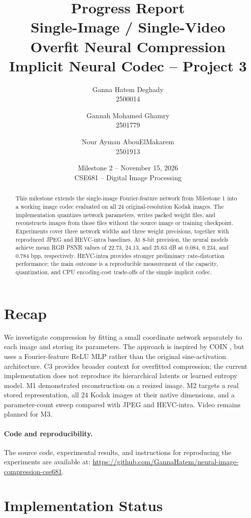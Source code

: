 \documentclass[11pt]{article}
\title{Progress Report\\[4pt]\large Single-Image / Single-Video Overfit Neural Compression\\Implicit Neural Codec -- Project 3}
\author{
Ganna Hatem Deghady\\2500014
\and
Gannah Mohamed Ghamry\\2501779
\and
Nour Ayman AbouElMakarem\\2501913
}
\date{Milestone 2 -- November 15, 2026\\CSE681 -- Digital Image Processing}
\begin{document}
\maketitle
\begin{abstract}
This milestone extends the single-image Fourier-feature network from Milestone 1 into a working image codec evaluated on all 24 original-resolution Kodak images. The implementation quantizes network parameters, writes packed weight files, and reconstructs images from those files without the source image or training checkpoint. Experiments cover three network widths and three weight precisions, together with reproduced JPEG and HEVC-intra baselines. At 8-bit precision, the neural models achieve mean RGB PSNR values of 22.73, 24.13, and 25.63 dB at 0.084, 0.234, and 0.784 bpp, respectively. HEVC-intra provides stronger preliminary rate-distortion performance; the main outcome is a reproducible measurement of the capacity, quantization, and CPU encoding-cost trade-offs of the simple implicit codec.
\end{abstract}
\section{Recap}
We investigate compression by fitting a small coordinate network separately to each image and storing its parameters. The approach is inspired by COIN \citep{coin}, but uses a Fourier-feature ReLU MLP rather than the original sine-activation architecture. C3 \citep{c3} provides broader context for overfitted compression; the current implementation does not reproduce its hierarchical latents or learned entropy model. M1 demonstrated reconstruction on a resized image. M2 targets a real stored representation, all 24 Kodak images at their native dimensions, and a parameter-count sweep compared with JPEG and HEVC-intra. Video remains planned for M3.
\paragraph{Code and reproducibility.}
The source code, experimental results, and instructions
for reproducing the experiments are available at:
\url{https://github.com/GannaHatem/neural-image-compression-cse681}.
\section{Implementation Status}
\end{document}
